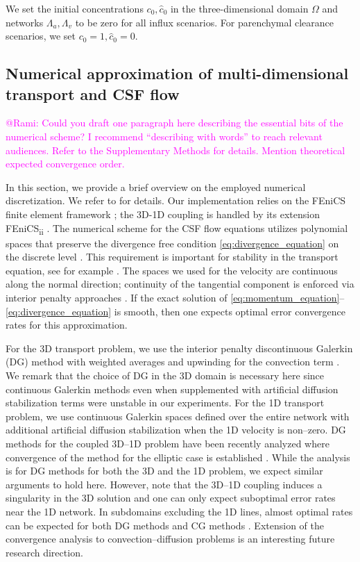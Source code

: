 \documentclass[fleqn,10pt]{wlscirep}
\newcommand{\mer}[1]{\textcolor{magenta}{#1}}
\begin{document}
We set the initial concentrations $c_0, \hat{c}_0$ in the
three-dimensional domain $\Omega$ and networks $\Lambda_a, \Lambda_v$
to be zero for all influx scenarios. For parenchymal
clearance scenarios, we set $c_0 = 1, \hat{c}_0 = 0$.

\subsection*{Numerical approximation of multi-dimensional transport and CSF flow}

\mer{@Rami: Could you draft one paragraph here describing the essential bits of the numerical scheme? I recommend ``describing with words'' to reach relevant audiences. Refer to the Supplementary Methods for details. Mention theoretical expected convergence order.} 

In this section, we provide a brief overview on the employed numerical discretization.  
We refer to  for details. 
Our implementation relies on the FEniCS finite element framework \cite{logg2012automated}; the 3D-1D coupling is handled by its extension FEniCS\textsubscript{ii} \cite{kuchta2020assembly}.
The numerical scheme for the CSF flow equations utilizes polynomial spaces that preserve the divergence free condition \eqref{eq:divergence_equation} on the discrete level \cite{hong2016robust}. This requirement is important for stability in the transport equation, see for example \cite{cesmelioglu2022compatible}. The spaces we used for the velocity are continuous along the normal direction; continuity of the tangential component is enforced via interior penalty approaches \cite{hong2016robust}.  If the exact solution of \eqref{eq:momentum_equation}--\eqref{eq:divergence_equation} is smooth, then one expects optimal error convergence rates for this approximation. 

For the 3D transport problem, we use the interior penalty discontinuous Galerkin (DG) method with weighted averages and upwinding for the convection term \cite{ern2009discontinuous}.  We remark that the choice of DG in the 3D domain is necessary here since  continuous Galerkin methods even when supplemented with artificial diffusion stabilization terms were unstable in our experiments. For the 1D transport problem, we use continuous Galerkin spaces defined over the entire network with additional artificial diffusion stabilization when the 1D velocity is non--zero.  DG methods for the coupled 3D--1D problem have been recently analyzed  where convergence of the method for the elliptic case is established \cite{masri2024discontinuous}. While the analysis is for DG methods for both the 3D and the 1D problem, we expect similar arguments to hold here. However, note that the 3D--1D coupling induces a singularity in the 3D solution and one can only expect suboptimal error rates near the 1D network. In subdomains excluding the 1D lines, almost optimal rates can be expected for both DG methods \cite{masri2023discontinuous} and CG methods \cite{koppl2016local}.  Extension of the convergence analysis to convection--diffusion problems is an interesting future research direction. 
\end{document}
